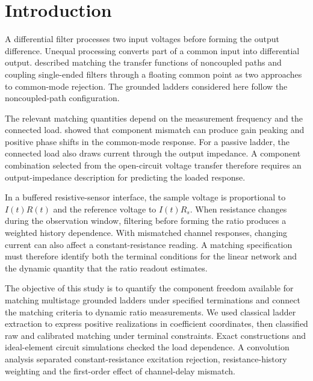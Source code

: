 \section{Introduction}

A differential filter processes two input voltages before forming the output difference. Unequal processing converts part of a common input into differential output. \citet{casas1996basics} described matching the transfer functions of noncoupled paths and coupling single-ended filters through a floating common point as two approaches to common-mode rejection. The grounded ladders considered here follow the noncoupled-path configuration.

The relevant matching quantities depend on the measurement frequency and the connected load. \citet{hornero2021cm} showed that component mismatch can produce gain peaking and positive phase shifts in the common-mode response. For a passive ladder, the connected load also draws current through the output impedance. A component combination selected from the open-circuit voltage transfer therefore requires an output-impedance description for predicting the loaded response.

In a buffered resistive-sensor interface, the sample voltage is proportional to $I(t)R(t)$ and the reference voltage to $I(t)R_s$. When resistance changes during the observation window, filtering before forming the ratio produces a weighted history dependence. With mismatched channel responses, changing current can also affect a constant-resistance reading. A matching specification must therefore identify both the terminal conditions for the linear network and the dynamic quantity that the ratio readout estimates.

The objective of this study is to quantify the component freedom available for matching multistage grounded ladders under specified terminations and connect the matching criteria to dynamic ratio measurements. We used classical ladder extraction to express positive realizations in coefficient coordinates, then classified raw and calibrated matching under terminal constraints. Exact constructions and ideal-element circuit simulations checked the load dependence. A convolution analysis separated constant-resistance excitation rejection, resistance-history weighting and the first-order effect of channel-delay mismatch.


